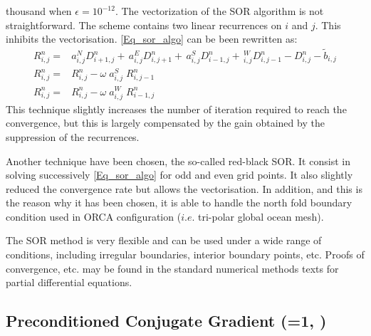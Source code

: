 \documentclass[NEMO_book]{subfiles}
\begin{document}
thousand when $\epsilon = 10^{-12}$.
The vectorization of the SOR algorithm is not straightforward. The scheme
contains two linear recurrences on $i$ and $j$. This inhibits the vectorisation. 
\eqref{Eq_sor_algo} can be been rewritten as:
\begin{equation} 
\begin{split}
R_{i,j}^n
= &a_{i,j}^{N}  D_{i+1,j}^n +\,a_{i,j}^{E}  D_{i,j+1} ^n
 +\,a_{i,j}^{S}  D_{i-1,j} ^{n}+\,_{i,j}^{W} D_{i,j-1} ^{n} -  D_{i,j}^n - \tilde{b}_{i,j}      \\
R_{i,j}^n = &R_{i,j}^n - \omega \;a_{i,j}^{S}\; R_{i,j-1}^n                                             \\
R_{i,j}^n = &R_{i,j}^n - \omega \;a_{i,j}^{W}\; R_{i-1,j}^n
\end{split}
\end{equation}
This technique slightly increases the number of iteration required to reach the convergence,
but this is largely compensated by the gain obtained by the suppression of the recurrences.

Another technique have been chosen, the so-called red-black SOR. It consist in solving successively 
\eqref{Eq_sor_algo} for odd and even grid points. It also slightly reduced the convergence rate
but allows the vectorisation. In addition, and this is the reason why it has been chosen, it is able to handle the north fold boundary condition used in ORCA configuration ($i.e.$ tri-polar global ocean mesh).

The SOR method is very flexible and can be used under a wide range of conditions, 
including irregular boundaries, interior boundary points, etc. Proofs of convergence, etc. 
may be found in the standard numerical methods texts for partial differential equations.

\subsection{Preconditioned Conjugate Gradient  (=1, ) }
\label{MISC_solpcg}
\end{document}
